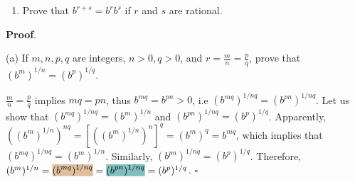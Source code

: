 \documentclass[10pt,varwidth=6in,margin=0.2in,preview]{standalone}
\newcommand{\highlightb}[1]{\setlength{\fboxsep}{0pt}\colorbox{brown!50}{$\displaystyle#1$}}
\newcommand{\highlightt}[1]{\setlength{\fboxsep}{0pt}\colorbox{teal!50}{$\displaystyle#1$}}
\begin{document}
\begin{flushleft}
\begin{enumerate}[label=(\alph*)]

\item
Prove that $b^{r+s} = b^r b^s$ if $r$ and $s$ are rational.

\end{enumerate}



\textbf{Proof}.

\vspace{0.1in}

(a) If $m, n, p, q$ are integers, $n > 0, q > 0$, and $r = \frac{m}{n} = \frac{p}{q}$, prove that $(b^m)^{1/n} = (b^p)^{1/q}$.


\vspace{0.1in}

$\frac{m}{n} = \frac{p}{q}$ implies $mq = pn$, thus $b^{mq} = b^{pn} > 0$, i.e $(b^{mq})^{1/nq} = (b^{pn})^{1/nq}$.
Let us show that $(b^{mq})^{1/nq} = (b^m)^{1/n}$ and $(b^{pn})^{1/nq} = (b^p)^{1/q}$.
Apparently, $\left( (b^m)^{1/n} \right)^{nq} = \left[ \left( (b^m)^{1/n} \right)^n \right]^q = (b^m)^q = b^{mq}$, which implies that $(b^{mq})^{1/nq} = (b^m)^{1/n}$.
Similarly, $(b^{pn})^{1/nq} = (b^p)^{1/q}$.
Therefore, $(b^m)^{1/n} = \highlightb{(b^{mq})^{1/nq}} = \highlightt{(b^{pn})^{1/nq}} = (b^p)^{1/q}$. $\square$


\end{flushleft}
\end{document}

